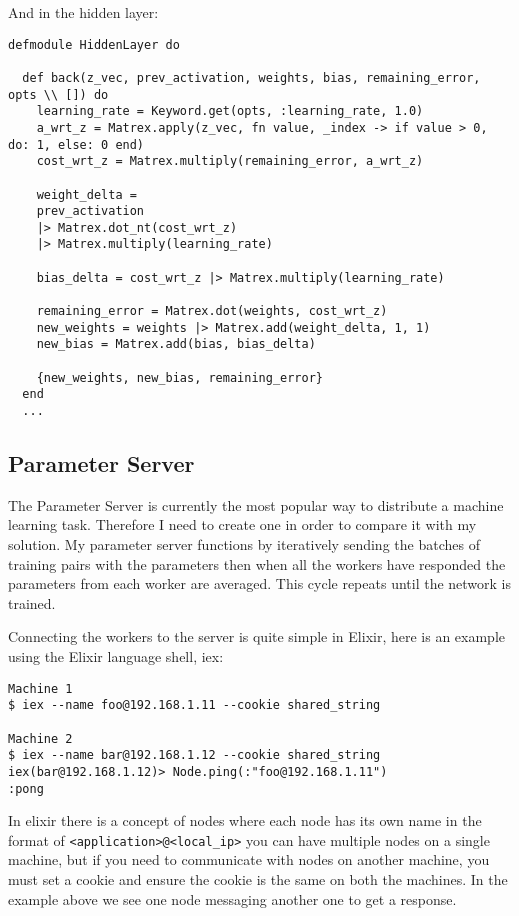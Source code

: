 And in the hidden layer:
\begin{lstlisting}[basicstyle=\linespread{0.8}\ttfamily\footnotesize]
defmodule HiddenLayer do

  def back(z_vec, prev_activation, weights, bias, remaining_error, opts \\ []) do
    learning_rate = Keyword.get(opts, :learning_rate, 1.0)
    a_wrt_z = Matrex.apply(z_vec, fn value, _index -> if value > 0, do: 1, else: 0 end)
    cost_wrt_z = Matrex.multiply(remaining_error, a_wrt_z)

    weight_delta =
    prev_activation
    |> Matrex.dot_nt(cost_wrt_z)
    |> Matrex.multiply(learning_rate)

    bias_delta = cost_wrt_z |> Matrex.multiply(learning_rate)

    remaining_error = Matrex.dot(weights, cost_wrt_z)
    new_weights = weights |> Matrex.add(weight_delta, 1, 1)
    new_bias = Matrex.add(bias, bias_delta)

    {new_weights, new_bias, remaining_error}
  end
  ...
\end{lstlisting}

\subsection{Parameter Server}
The Parameter Server is currently the most popular way to distribute a machine
learning task. Therefore I need to create one in order to compare it with my
solution. My parameter server functions by iteratively sending the batches of
training pairs with the parameters then when all the workers have responded the
parameters from each worker are averaged. This cycle repeats until the network
is trained.

Connecting the workers to the server is quite simple in Elixir, here is an
example using the Elixir language shell, iex:
\begin{lstlisting}[basicstyle=\linespread{0.8}\ttfamily\footnotesize,numbers=none]
Machine 1
$ iex --name foo@192.168.1.11 --cookie shared_string

Machine 2
$ iex --name bar@192.168.1.12 --cookie shared_string
iex(bar@192.168.1.12)> Node.ping(:"foo@192.168.1.11")
:pong
\end{lstlisting}

In elixir there is a concept of nodes where each node has its own name in the
format of \lstinline{<application>@<local_ip>} you can have multiple nodes on a
single machine, but if you need to communicate with nodes on another machine,
you must set a cookie and ensure the cookie is the same on both the machines. In
the example above we see one node messaging another one to get a response.

